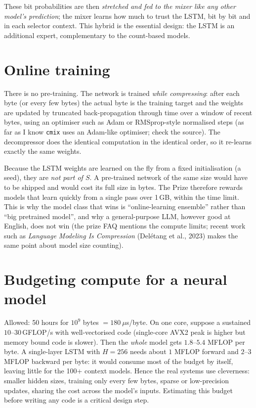 \documentclass[11pt,a4paper,openany]{book}
\newcommand{\code}[1]{\texttt{#1}}
\theoremstyle{definition}
\theoremstyle{remark}
\begin{document}
These bit probabilities are then \emph{stretched and fed to the mixer like any other model's prediction}; the mixer learns how much to trust the LSTM, bit by bit and in each selector context. This hybrid is the essential design: the LSTM is an additional expert, complementary to the count-based models.

\section{Online training}

There is no pre-training. The network is trained \emph{while compressing}: after each byte (or every few bytes) the actual byte is the training target and the weights are updated by truncated back-propagation through time over a window of recent bytes, using an optimiser such as Adam or RMSprop-style normalised steps (as far as I know \code{cmix} uses an Adam-like optimiser; check the source). The decompressor does the identical computation in the identical order, so it re-learns exactly the same weights.

\begin{keyidea}
Because the LSTM weights are learned on the fly from a fixed initialisation (a seed), they are \emph{not part of $S$}. A pre-trained network of the same size would have to be shipped and would cost its full size in bytes. The Prize therefore rewards models that learn quickly from a single pass over 1\,GB, within the time limit. This is why the model class that wins is ``online-learning ensemble'' rather than ``big pretrained model'', and why a general-purpose LLM, however good at English, does not win (the prize FAQ mentions the compute limits; recent work such as \emph{Language Modeling Is Compression} (Del\'etang et al., 2023) makes the same point about model size counting).
\end{keyidea}

\section{Budgeting compute for a neural model}

\begin{example}
Allowed: 50 hours for $10^9$ bytes $=180\ \mu$s/byte. On one core, suppose a sustained $10$--$30$\,GFLOP/s with well-vectorised code (single-core AVX2 peak is higher but memory bound code is slower). Then the \emph{whole} model gets $1.8$--$5.4$ MFLOP per byte. A single-layer LSTM with $H=256$ needs about $1$ MFLOP forward and $2$--$3$ MFLOP backward per byte: it would consume most of the budget by itself, leaving little for the 100+ context models. Hence the real systems use cleverness: smaller hidden sizes, training only every few bytes, sparse or low-precision updates, sharing the cost across the model's inputs. Estimating this budget before writing any code is a critical design step.
\end{example}
\end{document}
